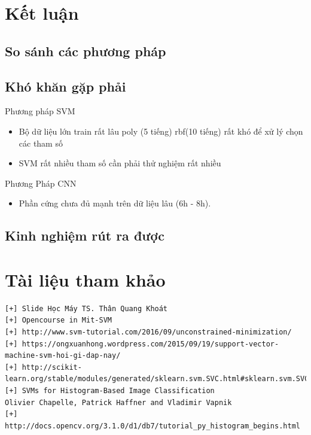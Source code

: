 \documentclass[a4paper,12pt]{report}
\begin{document}
\chapter{Kết luận}
\section{So sánh các phương pháp}
\section{Khó khăn gặp phải}
Phương pháp SVM
\begin{itemize}
\item Bộ dữ liệu lớn train rất lâu poly (5 tiếng) rbf(10 tiếng) rất khó để xử lý chọn các tham số 
\item SVM rất nhiều tham số cần phải thử nghiệm rất nhiều
\end{itemize}
Phương Pháp CNN
\begin{itemize}
\item Phần cứng chưa đủ mạnh trên dữ liệu lâu (6h - 8h).
\end{itemize}
\section{Kinh nghiệm rút ra được}
\chapter{Tài liệu tham khảo}
\begin{verbatim}
[+] Slide Học Máy TS. Thân Quang Khoát
[+] Opencourse in Mit-SVM 
[+] http://www.svm-tutorial.com/2016/09/unconstrained-minimization/
[+] https://ongxuanhong.wordpress.com/2015/09/19/support-vector-machine-svm-hoi-gi-dap-nay/
[+] http://scikit-learn.org/stable/modules/generated/sklearn.svm.SVC.html#sklearn.svm.SVC 
[+] SVMs for Histogram-Based Image Classification
Olivier Chapelle, Patrick Haffner and Vladimir Vapnik
[+] http://docs.opencv.org/3.1.0/d1/db7/tutorial_py_histogram_begins.html


\end{verbatim}
\end{document}
